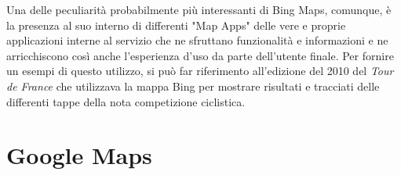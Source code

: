 Una delle peculiarità probabilmente più interessanti di Bing Maps, comunque, è la presenza al suo interno di differenti "Map Apps" delle vere e proprie applicazioni interne al servizio che ne sfruttano funzionalità e informazioni e ne arricchiscono così anche l'esperienza d'uso da parte dell'utente finale. Per fornire un esempi di questo utilizzo, si può far riferimento all'edizione del 2010 del \textit{Tour de France} che utilizzava la mappa Bing per mostrare risultati e tracciati delle differenti tappe della nota competizione ciclistica.\cite{bing:tdf}

\section{Google Maps}